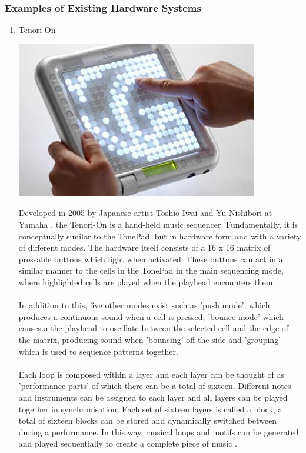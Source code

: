 \documentclass[10pt,a4paper]{article}
\begin{document}
\subsubsection{Examples of Existing Hardware Systems}
\begin{enumerate}
\item Tenori-On
\begin{center}
\includegraphics[scale=0.5]{3.jpg}\
\end{center}
Developed in 2005 by Japanese artist Toshio Iwai and Yu Nishibori at Yamaha \cite{tenorionwiki}, the Tenori-On is a hand-held music sequencer. Fundamentally, it is conceptually similar to the TonePad, but in hardware form and with a variety of different modes. The hardware itself consists of a 16 x 16 matrix of pressable buttons which light when activated. These buttons can act in a similar manner to the cells in the TonePad in the main sequencing mode, where highlighted cells are played when the playhead encounters them.\\
\\
In addition to this, five other modes exist such as 'push mode', which produces a continuous sound when a cell is pressed; 'bounce mode' which causes a the playhead to oscillate between the selected cell and the edge of the matrix, producing sound when 'bouncing' off the side and 'grouping' which is used to sequence patterns together.\\
\\
Each loop is composed within a layer and each layer can be thought of as 'performance parts' of which there can be a total of sixteen. Different notes and instruments can be assigned to each layer and all layers can be played together in synchronisation. Each set of sixteen layers is called a block; a total of sixteen blocks can be stored and dynamically switched between during a performance. In this way, musical loops and motifs can be generated and played sequentially to create a complete piece of music \cite{tenorionyamaha}.


\end{enumerate}
\end{document}
